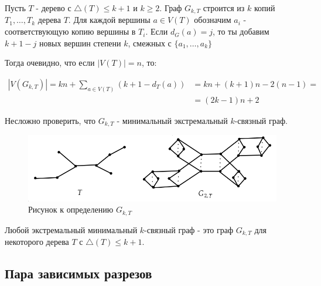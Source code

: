 \begin{df}[$G_{k,T}$]
	Пусть $T$ - дерево с  $\triangle(T) \leqslant k + 1$ и $k \geqslant 2$.
	Граф $G_{k, T}$ строится из  $k$ копий  $T_1, \ldots, T_k$ дерева $T$.
	Для каждой вершины  $a \in V(T)$ обозначим  $a_i$ - соответствующую копию вершины в $T_i$.
	Если  $d_G(a) = j$, то ты добавим  $k + 1 - j$ новых вершин степени  $k$, смежных с  $\{a_1, \ldots, a_k\}$

	Тогда очевидно, что если $|V(T)| = n$, то:

	\begin{align*}
		|V(G_{k, T})| = kn + \sum_{a \in V(T)} (k + 1 - d_T(a)) &= kn + (k + 1)n - 2 (n - 1) =\\
																&=(2k - 1)n + 2
	\end{align*}

	Несложно проверить, что  $G_{k, T}$ - минимальный  экстремальный $k$-связный граф. 

\begin{figure}[ht]
    \centering
	\includegraphics[width=0.5\columnwidth]{figures/3_definition_g_k_t.png}
    \caption{Рисунок к определению $G_{k, T}$}
\end{figure}

\end{df}

\begin{thm}[Теорема 3.2] \label{theorem:3_2}
	Любой экстремальный минимальный $k$-связный граф - это граф  $G_{k, T}$ для некоторого дерева  $T$ с  $\triangle(T) \leqslant k + 1$.
\end{thm}

\subsection{Пара зависимых разрезов}

